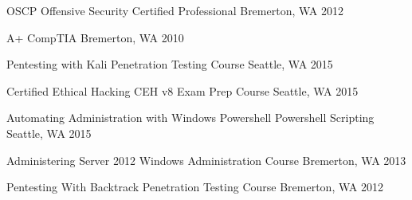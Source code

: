 



\begin{cvhonors}


\cvhonor
{OSCP} %
{Offensive Security Certified Professional} %
{Bremerton, WA} %
{2012} %

\cvhonor
{A+} %
{CompTIA} %
{Bremerton, WA} %
{2010} %

\end{cvhonors}



\begin{cvhonors}


\cvhonor
{Pentesting with Kali} %
{Penetration Testing Course} %
{Seattle, WA} %
{2015} %

\cvhonor
{Certified Ethical Hacking} %
{CEH v8 Exam Prep Course} %
{Seattle, WA} %
{2015} %

\cvhonor
{Automating Administration with Windows Powershell} %
{Powershell Scripting} %
{Seattle, WA} %
{2015} %

\cvhonor
{Administering Server 2012} %
{Windows Administration Course} %
{Bremerton, WA} %
{2013} %

\cvhonor
{Pentesting With Backtrack} %
{Penetration Testing Course} %
{Bremerton, WA} %
{2012} %





\end{cvhonors}
